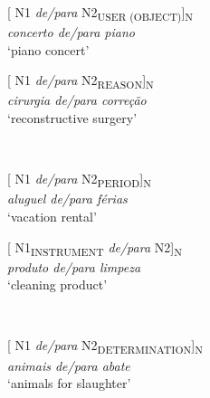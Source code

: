 \documentclass[output=paper]{langsci/langscibook}
\begin{document}
\begin{minipage}{0.4\textwidth}    %
[ N1 \textit{de/para} N2\textsubscript{USER (OBJECT)}]\textsubscript{N}\\
\textit{concerto de/para piano}\\
`piano concert'
\end{minipage}
\hfill            %
\begin{minipage}{0.4\textwidth}
[ N1 \textit{de/para} N2\textsubscript{REASON}]\textsubscript{N}\\
\textit{cirurgia de/para correção}\\
`reconstructive surgery'
\end{minipage} \\
\hfill
\vspace{0.5cm}

\begin{minipage}{0.4\textwidth}
[ N1 \textit{de/para} N2\textsubscript{PERIOD}]\textsubscript{N}\\
\textit{aluguel de/para férias}\\
`vacation rental'
\end{minipage} 
\hfill
\begin{minipage}{0.4\textwidth}
[ N1\textsubscript{INSTRUMENT} \textit{de/para} N2]\textsubscript{N}\\
\textit{produto de/para limpeza}\\
`cleaning product'
\end{minipage} \\
\hfill
\vspace{0.5cm}

\begin{minipage}{0.4\textwidth}
[ N1 \textit{de/para} N2\textsubscript{DETERMINATION}]\textsubscript{N}\\
\textit{animais de/para abate}\\
`animals for slaughter'
\end{minipage} \\
\end{document}
